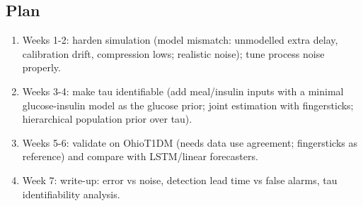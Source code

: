 \documentclass[11pt,a4paper]{article}
\providecommand{\tightlist}{\setlength{\itemsep}{0pt}\setlength{\parskip}{0pt}}
\begin{document}
\hypertarget{plan}{%
\subsection{Plan}\label{plan}}

\begin{enumerate}
\def\labelenumi{\arabic{enumi}.}
\tightlist
\item
  Weeks 1-2: harden simulation (model mismatch: unmodelled extra delay,
  calibration drift, compression lows; realistic noise); tune process
  noise properly.
\item
  Weeks 3-4: make tau identifiable (add meal/insulin inputs with a
  minimal glucose-insulin model as the glucose prior; joint estimation
  with fingersticks; hierarchical population prior over tau).
\item
  Weeks 5-6: validate on OhioT1DM (needs data use agreement;
  fingersticks as reference) and compare with LSTM/linear forecasters.
\item
  Week 7: write-up: error vs noise, detection lead time vs false alarms,
  tau identifiability analysis.
\end{enumerate}
\end{document}
